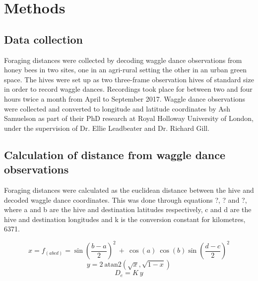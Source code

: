 \documentclass[11pt,usenames,dvipsnames]{article}
\begin{document}
\section{Methods}

\subsection{Data collection}

\begin{linenumbers}
\hspace{\parindent}
Foraging distances were collected by decoding waggle dance observations from honey bees in two sites, one in an agri-rural setting the other in an urban green space. The hives were set up as two three-frame observation hives of standard size in order to record waggle dances. Recordings took place for between two and four hours twice a month from April to September 2017. Waggle dance observations were collected and converted to longitude and latitude coordinates by Ash Samuelson as part of their PhD research at Royal Holloway University of London, under the supervision of Dr. Ellie Leadbeater and Dr. Richard Gill.
\end{linenumbers}

\subsection{Calculation of distance from waggle dance observations}

\begin{linenumbers}
\hspace{\parindent}
Foraging distances were calculated as the euclidean distance between the hive and decoded waggle dance coordinates. This was done through equations ?, ? and ?, where a and b are the hive and destination latitudes respectively, c and d are the hive and destination longitudes and k is the conversion constant for kilometres, 6371.
\end{linenumbers}
\begin{equation}
x = f_{(abcd)} = \sin\left(\frac{b - a}{2}\right)^2\ +\ \cos(a)\ \cos(b) \sin\left(\frac{d - c}{2}\right)^2 
\end{equation}
\begin{equation}
y = 2\ \text{atan2}(\sqrt{x}, \sqrt{1 - x})
\end{equation}
\begin{equation}
D_e = K\ y
\end{equation}
\end{document}
